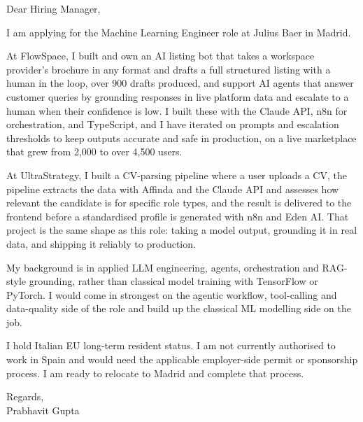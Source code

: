 \documentclass[a4paper,11pt]{article}
\begin{document}
Dear Hiring Manager,

I am applying for the Machine Learning Engineer role at Julius Baer in Madrid.

At FlowSpace, I built and own an AI listing bot that takes a workspace provider's brochure in any format and drafts a full structured listing with a human in the loop, over 900 drafts produced, and support AI agents that answer customer queries by grounding responses in live platform data and escalate to a human when their confidence is low. I built these with the Claude API, n8n for orchestration, and TypeScript, and I have iterated on prompts and escalation thresholds to keep outputs accurate and safe in production, on a live marketplace that grew from 2,000 to over 4,500 users.

At UltraStrategy, I built a CV-parsing pipeline where a user uploads a CV, the pipeline extracts the data with Affinda and the Claude API and assesses how relevant the candidate is for specific role types, and the result is delivered to the frontend before a standardised profile is generated with n8n and Eden AI. That project is the same shape as this role: taking a model output, grounding it in real data, and shipping it reliably to production.

My background is in applied LLM engineering, agents, orchestration and RAG-style grounding, rather than classical model training with TensorFlow or PyTorch. I would come in strongest on the agentic workflow, tool-calling and data-quality side of the role and build up the classical ML modelling side on the job.

I hold Italian EU long-term resident status. I am not currently authorised to work in Spain and would need the applicable employer-side permit or sponsorship process. I am ready to relocate to Madrid and complete that process.

Regards,\\
Prabhavit Gupta
\end{document}
